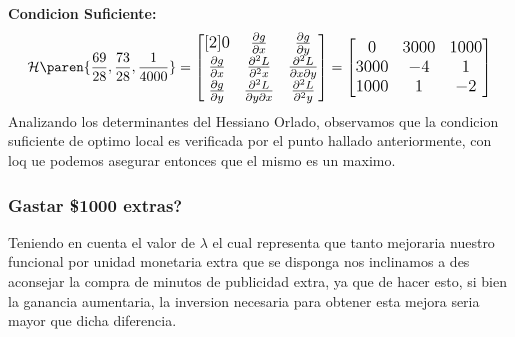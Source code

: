 \begin{homeworkProblem}[-1][Publicidad]
\textbf{Condicion Suficiente:}\\
\begin{align*}
    \mathcal{H}\paren{\frac{69}{28},\frac{73}{28},\frac{1}{4000}}=
    \large{\begin{bmatrix}[2]
        0 & \frac{\partial g}{\partial x}  & \frac{\partial g}{\partial y} \\
         \frac{\partial g}{\partial x}  & \frac{\partial^2 L}{\partial^2 x} & \frac{\partial^2 L}{\partial x \partial y} \\
         \frac{\partial g}{\partial y} & \frac{\partial^2 L}{\partial y \partial x}& \frac{\partial^2 L }{\partial^2 y } 
    \end{bmatrix}} = \begin{bmatrix}
       0 & 3000 & 1000 \\
       3000 & -4 & 1 \\
       1000 & 1 & -2
    \end{bmatrix}
\end{align*}
Analizando los determinantes del Hessiano Orlado, observamos que la condicion suficiente de optimo local es verificada por el punto hallado anteriormente, con loq ue podemos asegurar entonces que el mismo es un maximo.

\subsubsection{Gastar \$1000 extras?}
Teniendo en cuenta el valor de $\lambda$ el cual representa que tanto mejoraria nuestro funcional por unidad monetaria extra que se disponga
nos inclinamos a des aconsejar la compra de minutos de publicidad extra, ya que de hacer esto, si bien la ganancia aumentaria, la inversion necesaria para obtener esta mejora seria mayor que dicha diferencia.

\end{homeworkProblem}